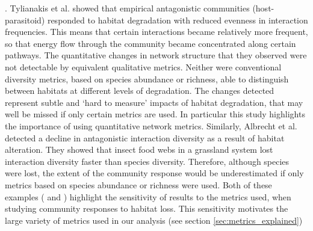 . Tylianakis et al. \cite{tylianakis2007habitat} showed that empirical antagonistic communities (host-parasitoid) responded to habitat degradation with reduced evenness in interaction frequencies. This means that certain interactions became relatively more frequent, so that energy flow through the community became concentrated along certain pathways. The quantitative changes in network structure that they observed were not detectable by equivalent qualitative metrics. Neither were conventional diversity metrics, based on species abundance or richness, able to distinguish between habitats at different levels of degradation. The changes detected represent subtle and `hard to measure' impacts of habitat degradation, that may well be missed if only certain metrics are used. In particular this study highlights the importance of using quantitative network metrics. Similarly, Albrecht et al. \cite{albrecht2007interaction} detected a decline in antagonistic interaction diversity as a result of habitat alteration. They showed that insect food webs in a grassland system lost interaction diversity faster than species diversity. Therefore, although species were lost, the extent of the community response would be underestimated if only metrics based on species abundance or richness were used. Both of these examples (\cite{tylianakis2007habitat} and \cite{albrecht2007interaction}) highlight the sensitivity of results to the metrics used, when studying community responses to habitat loss. This sensitivity motivates the large variety of metrics used in our analysis (see section \ref{sec:metrics_explained})

